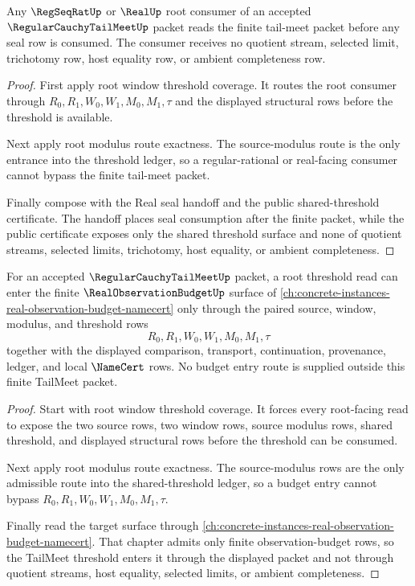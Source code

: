 \begin{theorem}
\label{thm:regular-cauchy-tail-meet-root-real-seal-consumer-exhaustion}
Any $\RegSeqRatUp$ or $\RealUp$ root consumer of an accepted $\RegularCauchyTailMeetUp$ packet reads the finite tail-meet packet before any seal row is consumed. The consumer receives no quotient stream, selected limit, trichotomy row, host equality row, or ambient completeness row.
\end{theorem}
\begin{proof}
First apply root window threshold coverage. It routes the root consumer through $R_0,R_1,W_0,W_1,M_0,M_1,\tau$ and the displayed structural rows before the threshold is available.

Next apply root modulus route exactness. The source-modulus route is the only entrance into the threshold ledger, so a regular-rational or real-facing consumer cannot bypass the finite tail-meet packet.

Finally compose with the Real seal handoff and the public shared-threshold certificate. The handoff places seal consumption after the finite packet, while the public certificate exposes only the shared threshold surface and none of quotient streams, selected limits, trichotomy, host equality, or ambient completeness.
\end{proof}

\begin{theorem}
\label{thm:regular-cauchy-tail-meet-root-observation-budget-entry}
For an accepted $\RegularCauchyTailMeetUp$ packet, a root threshold read can enter the finite $\RealObservationBudgetUp$ surface of \autoref{ch:concrete-instances-real-observation-budget-namecert} only through the paired source, window, modulus, and threshold rows
$$
R_0,R_1,W_0,W_1,M_0,M_1,\tau
$$
together with the displayed comparison, transport, continuation, provenance, ledger, and local $\NameCert$ rows. No budget entry route is supplied outside this finite TailMeet packet.
\end{theorem}
\begin{proof}
Start with root window threshold coverage. It forces every root-facing read to expose the two source rows, two window rows, source modulus rows, shared threshold, and displayed structural rows before the threshold can be consumed.

Next apply root modulus route exactness. The source-modulus rows are the only admissible route into the shared-threshold ledger, so a budget entry cannot bypass $R_0,R_1,W_0,W_1,M_0,M_1,\tau$.

Finally read the target surface through \autoref{ch:concrete-instances-real-observation-budget-namecert}. That chapter admits only finite observation-budget rows, so the TailMeet threshold enters it through the displayed packet and not through quotient streams, host equality, selected limits, or ambient completeness.
\end{proof}

